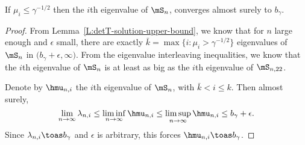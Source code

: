 \begin{lemma}\label{L:eigenvalue-below-threshold-limit}
    If $\mu_i \leq \gamma^{-1/2}$ then the $i$th eigenvalue of
    $\mS_n$, converges almost surely to $b_\gamma$.
\end{lemma}
\begin{proof}
From Lemma~\ref{L:detT-solution-upper-bound}, we know that for $n$ large
enough and $\epsilon$ small, there are exactly
$\bar k = \max \{ i : \mu_i > \gamma^{-1/2} \}$ eigenvalues of $\mS_n$
in $\big( b_\gamma + \epsilon, \infty)$.  From the eigenvalue interleaving
inequalities, we know that the $i$th eigenvalue of $\mS_n$ is at least as
big as the $i$th eigenvalue of $\mS_{n,22}$.  

Denote by $\hmu_{n,i}$ the $i$th eigenvalue of $\mS_n$, with
$\bar k < i \leq k$.  Then almost surely,
\[
    \lim_{n\to\infty} \lambda_{n,i} 
        \leq
        \liminf_{n\to\infty} \hmu_{n,i}
        \leq
        \limsup_{n\to\infty} \hmu_{n,i}        
        \leq
        b_\gamma + \epsilon.
\]
Since $\lambda_{n,i} \toas b_\gamma$ and $\epsilon$ is arbitrary, this
forces $\hmu_{n,i} \toas b_\gamma$.
\end{proof}

